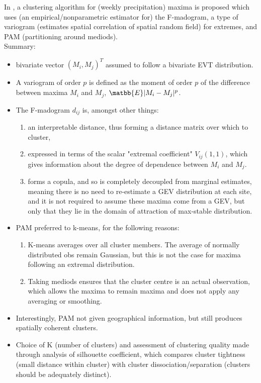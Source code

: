 \documentclass{article}
\numberwithin{equation}{section}
\begin{document}
In \cite{Bernard2013}, a clustering algorithm for (weekly precipitation) maxima is proposed which uses (an empirical/nonparametric estimator for) the F-madogram, a type of variogram (estimates spatial correlation of spatial random field) for extremes, and PAM (partitioning around mediods). \\
Summary:
\begin{itemize}
  \item bivariate vector $(M_i, M_j)^T$ assumed to follow a bivariate EVT distribution.
  \item A variogram of order $p$ is defined as the moment of order $p$ of the difference between maxima $M_i$ and $M_j$, $\matbb{E}|M_i - M_j|^p$.
  \item The F-madogram $d_{ij}$ is, amongst other things:
    \begin{enumerate}
      \item an interpretable distance, thus forming a distance matrix over which to cluster,
      \item expressed in terms of the scalar "extremal coefficient" $V_{ij}(1, 1)$, which gives information about the degree of dependence between $M_i$ and $M_j$. 
      \item forms a copula, and so is completely decoupled from marginal estimates, meaning there is no need to re-estimate a GEV distribution at each site, and it is not required to assume these maxima come from a GEV, but only that they lie in the domain of attraction of max-stable distribution. 
    \end{enumerate}
  \item PAM preferred to k-means, for the following reasons:
    \begin{enumerate}
      \item K-means averages over all cluster members. 
      The average of normally distributed obs remain Gaussian, but this is not the case for maxima following an extremal distribution.
      \item Taking mediods ensures that the cluster centre is an actual observation, which allows the maxima to remain maxima and does not apply any averaging or smoothing. 
    \end{enumerate}
  \item Interestingly, PAM not given geographical information, but still produces spatially coherent clusters. 
  \item Choice of K (number of clusters) and assessment of clustering quality made through analysis of silhouette coefficient, which compares cluster tightness (small distance within cluster) with cluster dissociation/separation (clusters should be adequately distinct).
\end{itemize}
\end{document}
